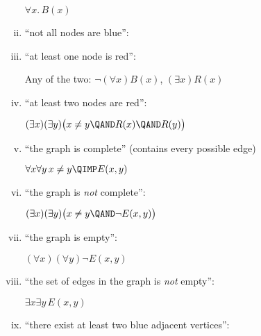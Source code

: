 \begin{problem}
\begin{enumerate}[(i)]
\begin{solution}
$\forall x.\, B(x)$\hrulefill
\end{solution}

\item ``not all nodes are blue'': 

\item ``at least one node is red'': 

\begin{solution}
Any of the two: $\neg(\forall x)B(x)$, $(\exists x)R(x)$
\end{solution}

\item ``at least two nodes are red'': 

\begin{solution}
$(\exists x)(\exists y)\bigl( x\neq y \QAND R(x) \QAND R(y) \bigr)$
\end{solution}

\examspace[0.75in]

\item ``the graph is complete'' (contains every possible edge)

\begin{solution}
$\forall x\forall y\, x\neq y \QIMP E(x,y)$
\end{solution}

\examspace[0.75in]

\item ``the graph is \emph{not} complete'': 

\begin{solution}
$(\exists x)(\exists y)\bigl( x\neq y \QAND \neg E(x,y) \bigr)$
\end{solution}\hrulefill

\item ``the graph is empty'': 

\begin{solution}
$(\forall x)(\forall y) \neg E(x,y)$
\end{solution}

\item \label{item-fourth}
``the set of edges in the graph is \emph{not} empty'': 

\begin{solution}
$\exists x\exists y\, E(x,y)$
\end{solution}

\examspace[0.75in]

\item ``there exist at least two blue adjacent vertices'':


\end{enumerate}
\end{problem}
